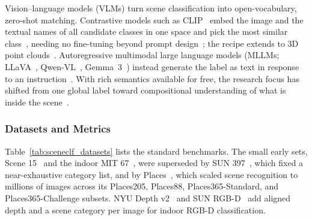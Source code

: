 Vision--language models (VLMs) turn scene classification into open-vocabulary, zero-shot matching.
Contrastive models such as CLIP~\cite{radford2021learning} embed the image and the textual names of all candidate classes in one space and pick the most similar class~\cite{li2023rs}, needing no fine-tuning beyond prompt design~\cite{sahoo2024systematic}; the recipe extends to 3D point clouds~\cite{huang2023clip2point}.
Autoregressive multimodal large language models (MLLMs; LLaVA~\cite{liu2023llava}, Qwen-VL~\cite{bai2023qwen}, Gemma~3~\cite{team2025gemma}) instead generate the label as text in response to an instruction~\cite{Saha_2024_CVPR}.
With rich semantics available for free, the research focus has shifted from one global label toward compositional understanding of what is inside the scene~\cite{chen2023clip2scene}.

\subsubsection{Datasets and Metrics}
Table~\ref{tab:sceneclf_datasets} lists the standard benchmarks. The small early sets, Scene 15~\cite{lazebnik2006beyond} and the indoor MIT 67~\cite{quattoni2009recognizing}, were superseded by SUN 397~\cite{XiaoHEOT10,Xiao2014SUNDE}, which fixed a near-exhaustive category list, and by Places~\cite{zhou2014learning, zhou2017places}, which scaled scene recognition to millions of images across its Places205, Places88, Places365-Standard, and Places365-Challenge subsets. NYU Depth v2~\cite{silberman2012nyudv2} and SUN RGB-D~\cite{song2015sunrgbd} add aligned depth and a scene category per image for indoor RGB-D classification.

